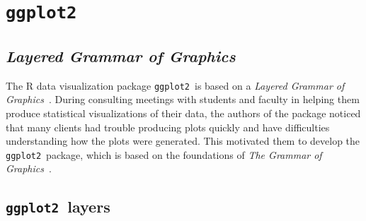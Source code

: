 \documentclass[stat,dissertation]{puthesis}\usepackage[]{graphicx}\usepackage{xcolor}
\newcommand{\pkg}[1]{\texttt{#1}}
\newcommand{\ggplot}{\pkg{ggplot2}}
\begin{document}
\section{\ggplot}










\subsection{\emph{Layered Grammar of Graphics}}

The R data visualization package \ggplot~is based on a \emph{Layered Grammar of Graphics}~\cite{layered_grammar}.  During consulting meetings with students and faculty in helping them produce statistical visualizations of their data, the authors of the package noticed that many clients had trouble producing plots quickly and have difficulties understanding how the plots were generated.  This motivated them to develop the \ggplot~package, which is based on the foundations of \emph{The Grammar of Graphics}~\cite{}.

\subsection{\ggplot~layers}
\end{document}
